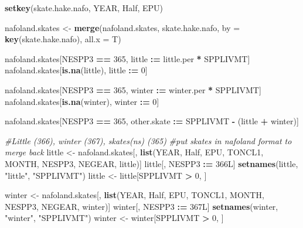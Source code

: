 \documentclass[]{article}
\newenvironment{Shaded}{\begin{snugshade}}{\end{snugshade}}
\newcommand{\KeywordTok}[1]{\textcolor[rgb]{0.13,0.29,0.53}{\textbf{#1}}}
\newcommand{\DataTypeTok}[1]{\textcolor[rgb]{0.13,0.29,0.53}{#1}}
\newcommand{\DecValTok}[1]{\textcolor[rgb]{0.00,0.00,0.81}{#1}}
\newcommand{\StringTok}[1]{\textcolor[rgb]{0.31,0.60,0.02}{#1}}
\newcommand{\CommentTok}[1]{\textcolor[rgb]{0.56,0.35,0.01}{\textit{#1}}}
\newcommand{\OperatorTok}[1]{\textcolor[rgb]{0.81,0.36,0.00}{\textbf{#1}}}
\newcommand{\ErrorTok}[1]{\textcolor[rgb]{0.64,0.00,0.00}{\textbf{#1}}}
\newcommand{\NormalTok}[1]{#1}
\begin{document}
\begin{Shaded}
\begin{Highlighting}[]
{{{{{{{{{{{{  \KeywordTok{setkey}\NormalTok{(skate.hake.nafo,}
\NormalTok{         YEAR,}
\NormalTok{         Half,}
\NormalTok{         EPU)}
  
\NormalTok{  nafoland.skates <-}\StringTok{ }\KeywordTok{merge}\NormalTok{(nafoland.skates, skate.hake.nafo, }\DataTypeTok{by =} \KeywordTok{key}\NormalTok{(skate.hake.nafo), }\DataTypeTok{all.x =}\NormalTok{ T)}
  
\NormalTok{  nafoland.skates[NESPP3 }\OperatorTok{==}\StringTok{ }\DecValTok{365}\NormalTok{, little }\OperatorTok{:}\ErrorTok{=}\StringTok{ }\NormalTok{little.per }\OperatorTok{*}\StringTok{ }\NormalTok{SPPLIVMT]}
\NormalTok{  nafoland.skates[}\KeywordTok{is.na}\NormalTok{(little), little }\OperatorTok{:}\ErrorTok{=}\StringTok{ }\DecValTok{0}\NormalTok{]}
  
\NormalTok{  nafoland.skates[NESPP3 }\OperatorTok{==}\StringTok{ }\DecValTok{365}\NormalTok{, winter }\OperatorTok{:}\ErrorTok{=}\StringTok{ }\NormalTok{winter.per }\OperatorTok{*}\StringTok{ }\NormalTok{SPPLIVMT]}
\NormalTok{  nafoland.skates[}\KeywordTok{is.na}\NormalTok{(winter), winter }\OperatorTok{:}\ErrorTok{=}\StringTok{ }\DecValTok{0}\NormalTok{]}
  
\NormalTok{  nafoland.skates[NESPP3 }\OperatorTok{==}\StringTok{ }\DecValTok{365}\NormalTok{, other.skate }\OperatorTok{:}\ErrorTok{=}\StringTok{ }\NormalTok{SPPLIVMT }\OperatorTok{-}\StringTok{ }\NormalTok{(little }\OperatorTok{+}\StringTok{ }\NormalTok{winter)]}
  
  \CommentTok{#Little (366), winter (367), skates(ns) (365)}
  \CommentTok{#put skates in nafoland format to merge back}
\NormalTok{  little <-}\StringTok{ }\NormalTok{nafoland.skates[, }\KeywordTok{list}\NormalTok{(YEAR, Half, EPU, TONCL1, MONTH, }
\NormalTok{                                   NESPP3, NEGEAR, little)]}
\NormalTok{  little[, NESPP3 }\OperatorTok{:}\ErrorTok{=}\StringTok{ }\NormalTok{366L]}
  \KeywordTok{setnames}\NormalTok{(little, }\StringTok{"little"}\NormalTok{, }\StringTok{"SPPLIVMT"}\NormalTok{)}
\NormalTok{  little <-}\StringTok{ }\NormalTok{little[SPPLIVMT }\OperatorTok{>}\StringTok{ }\DecValTok{0}\NormalTok{, ]}
  
\NormalTok{  winter <-}\StringTok{ }\NormalTok{nafoland.skates[, }\KeywordTok{list}\NormalTok{(YEAR, Half, EPU, TONCL1, MONTH, }
\NormalTok{                                   NESPP3, NEGEAR, winter)]}
\NormalTok{  winter[, NESPP3 }\OperatorTok{:}\ErrorTok{=}\StringTok{ }\NormalTok{367L]}
  \KeywordTok{setnames}\NormalTok{(winter, }\StringTok{"winter"}\NormalTok{, }\StringTok{"SPPLIVMT"}\NormalTok{)}
\NormalTok{  winter <-}\StringTok{ }\NormalTok{winter[SPPLIVMT }\OperatorTok{>}\StringTok{ }\DecValTok{0}\NormalTok{, ]}
  
}}}}}}}}}}}}
\end{Highlighting}
\end{Shaded}
\end{document}
